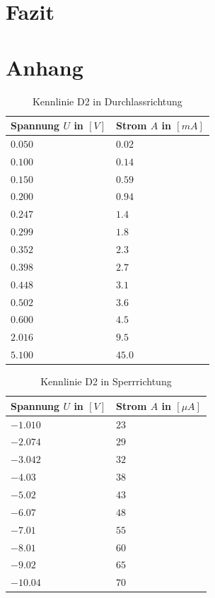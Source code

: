 \documentclass{article}
\theoremstyle{definition}
\begin{document}
\section{Fazit}

\section{Anhang}

    
\begin{table}[h!]
    \centering
    \begin{tabular}{|l|l|}
    \hline
    \textbf{Spannung $U$ in $[V]$} & \textbf{Strom $A$ in $[mA]$} \\
    \hline
    $0.050$ & $0.02$ \\
    $0.100$ & $0.14$ \\
    $0.150$ & $0.59$ \\
    $0.200$ & $0.94$\\
    $0.247$ & $1.4$ \\
    $0.299$ & $1.8$ \\
    $0.352$ & $2.3$ \\
    $0.398$ & $2.7$\\
    $0.448$ & $3.1$ \\
    $0.502$ & $3.6$ \\
    $0.600$ & $4.5$ \\
    $2.016$ & $9.5$ \\
    $5.100$ & $45.0$ \\
    \hline
    \end{tabular}
    \caption{Kennlinie D2 in Durchlassrichtung}
    \label{tab:D2duchlass}
    \end{table}
    
    
    \begin{table}[h!]
    \centering
    \begin{tabular}{|l|l|}
    \hline
    \textbf{Spannung $U$ in $[V]$} & \textbf{Strom $A$ in $[\mu A]$} \\
    \hline
    $-1.010$ & $23$ \\
    $-2.074$ & $29$\\
    $-3.042$ & $32$\\
    $-4.03$ & $38$\\
    $-5.02$ & $43$\\
    $-6.07$ & $48$\\
    $-7.01$ & $55$\\
    $-8.01$ & $60$\\
    $-9.02$ & $65$\\
    $-10.04$ & $70$\\ 
    \hline
    \end{tabular}
    \caption{Kennlinie D2 in Sperrrichtung}
    \label{tab:D2sperr}
    \end{table}
\end{document}
